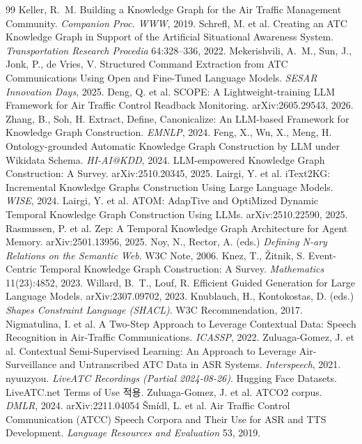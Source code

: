 \documentclass[10pt,a4paper]{article}
\begin{document}
\begin{thebibliography}{99}
 Keller, R.~M. Building a Knowledge Graph for the Air Traffic Management Community. \emph{Companion Proc. WWW}, 2019.
 Schrefl, M. et al. Creating an ATC Knowledge Graph in Support of the Artificial Situational Awareness System. \emph{Transportation Research Procedia} 64:328--336, 2022.
 Mekerishvili, A.~M., Sun, J., Jonk, P., de Vries, V. Structured Command Extraction from ATC Communications Using Open and Fine-Tuned Language Models. \emph{SESAR Innovation Days}, 2025.
 Deng, Q. et al. SCOPE: A Lightweight-training LLM Framework for Air Traffic Control Readback Monitoring. arXiv:2605.29543, 2026.
 Zhang, B., Soh, H. Extract, Define, Canonicalize: An LLM-based Framework for Knowledge Graph Construction. \emph{EMNLP}, 2024.
 Feng, X., Wu, X., Meng, H. Ontology-grounded Automatic Knowledge Graph Construction by LLM under Wikidata Schema. \emph{HI-AI@KDD}, 2024.
 LLM-empowered Knowledge Graph Construction: A Survey. arXiv:2510.20345, 2025.
 Lairgi, Y. et al. iText2KG: Incremental Knowledge Graphs Construction Using Large Language Models. \emph{WISE}, 2024.
 Lairgi, Y. et al. ATOM: AdapTive and OptiMized Dynamic Temporal Knowledge Graph Construction Using LLMs. arXiv:2510.22590, 2025.
 Rasmussen, P. et al. Zep: A Temporal Knowledge Graph Architecture for Agent Memory. arXiv:2501.13956, 2025.
 Noy, N., Rector, A. (eds.) \emph{Defining N-ary Relations on the Semantic Web}. W3C Note, 2006.
 Knez, T., \v{Z}itnik, S. Event-Centric Temporal Knowledge Graph Construction: A Survey. \emph{Mathematics} 11(23):4852, 2023.
 Willard, B.~T., Louf, R. Efficient Guided Generation for Large Language Models. arXiv:2307.09702, 2023.
 Knublauch, H., Kontokostas, D. (eds.) \emph{Shapes Constraint Language (SHACL)}. W3C Recommendation, 2017.
 Nigmatulina, I. et al. A Two-Step Approach to Leverage Contextual Data: Speech Recognition in Air-Traffic Communications. \emph{ICASSP}, 2022.
 Zuluaga-Gomez, J. et al. Contextual Semi-Supervised Learning: An Approach to Leverage Air-Surveillance and Untranscribed ATC Data in ASR Systems. \emph{Interspeech}, 2021.
 nyuuzyou. \emph{LiveATC Recordings (Partial 2024-08-26)}. Hugging Face Datasets. LiveATC.net Terms of Use 적용.
 Zuluaga-Gomez, J. et al. ATCO2 corpus. \emph{DMLR}, 2024. arXiv:2211.04054
 \v{S}m\'idl, L. et al. Air Traffic Control Communication (ATCC) Speech Corpora and Their Use for ASR and TTS Development. \emph{Language Resources and Evaluation} 53, 2019.

\end{thebibliography}
\end{document}
